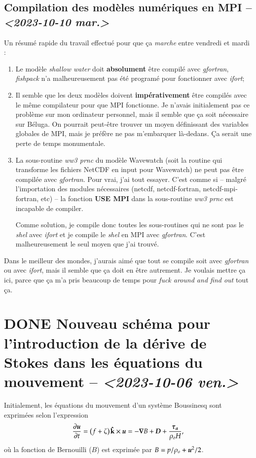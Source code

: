 \documentclass[10pt]{article}
\numberwithin{equation}{section}
\newcommand{\kvf}{\vb{\hat{k}}}
\newcommand{\uu}{\vb*{u}}
\newcommand{\pt}{\hspace{1pt}} %
\begin{document}
\subsection{Compilation des modèles numériques en MPI -- \textit{<2023-10-10 mar.>}}
\label{sec:orgb4b347d}
Un résumé rapide du travail effectué pour que ça \emph{marche} entre vendredi et mardi : \bigskip
\begin{enumerate}
\item Le modèle \emph{shallow water} doit \textbf{absolument} être compilé avec \emph{gfortran}, \emph{fishpack} n'a malheureusement pas été programé pour fonctionner avec \emph{ifort};\bigskip
\item Il semble que les deux modèles doivent \textbf{impérativement} être compilés avec le même compilateur pour que MPI fonctionne.
Je n'avais initialement pas ce problème sur mon ordinateur personnel, mais il semble que ça soit nécessaire sur Béluga.
On pourrait peut-être trouver un moyen définissant des variables globales de MPI, mais je préfère ne pas m'embarquer là-dedans. Ça serait une perte de temps monumentale.\bigskip
\item La sous-routine \emph{ww3 prnc} du modèle Wavewatch (soit la routine qui transforme les fichiers NetCDF en input pour Wavewatch) ne peut pas être compilée avec \emph{gfortran}. Pour vrai, j'ai tout essayer.
C'est comme si -- malgré l'importation des modules nécessaires (netcdf, netcdf-fortran, netcdf-mpi-fortran, etc) -- la fonction \textbf{USE MPI} dans la sous-routine \emph{ww3 prnc} est incapable de compiler.\bigskip

Comme solution, je compile donc toutes les sous-routines qui ne sont pas le \emph{shel} avec \emph{ifort} et je compile le \emph{shel} en MPI avec \emph{gfortran}.
C'est malheureusement le seul moyen que j'ai trouvé.\bigskip
\end{enumerate}

Dans le meilleur des mondes, j'aurais aimé que tout se compile soit avec \emph{gfortran} ou avec \emph{ifort}, mais il semble que ça doit en être autrement.
Je voulais mettre ça ici, parce que ça m'a pris beaucoup de temps pour \emph{fuck around and find out} tout ça.


\section{{\bfseries\sffamily DONE} Nouveau schéma pour l'introduction de la dérive de Stokes dans les équations du mouvement -- \textit{<2023-10-06 ven.>}}
\label{sec:orgf7031f1}
Initialement, les équations du mouvement d'un système Boussinesq sont exprimées selon l'expression
\begin{equation}
\label{eq:org2efba79}
   \pdv{\uu}{t} = \qty(f+\zeta)\pt \kvf\times\uu = -\gradient{B} + \boldsymbol{D} + \frac{\boldsymbol{\tau_a}}{\rho_o H},
\end{equation}
où la fonction de Bernouilli (\(B\)) est exprimée par \(B = p/\rho_o + \uu^2/2\).\bigskip
\end{document}
